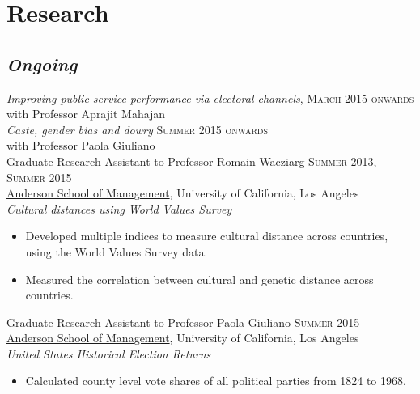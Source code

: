 \documentclass[11pt]{article}
\begin{document}
\section{Research}
\label{sec-2}
\subsection{\textbf{\emph{Ongoing}}}
\label{sec-2-1}
\flushleft
\emph{Improving public service performance via electoral channels}, \hfill \textsc{\normalsize March 2015 onwards}\\
with Professor Aprajit Mahajan\\
\vspace{0.5em}
\emph{Caste, gender bias and dowry} \hfill \textsc{\normalsize Summer 2015 onwards}\\
with Professor Paola Giuliano\\
\vspace{0.5em}
Graduate Research Assistant to Professor Romain Wacziarg \hfill
\textsc{\normalsize Summer 2013, Summer 2015}\\
\href{http://www.anderson.ucla.edu/faculty/global-economics-and-management/phd-program}{Anderson School of Management}, University of California, Los Angeles \\
\emph{Cultural distances using World Values Survey}
\begin{itemize}
\item Developed multiple indices to measure cultural distance across countries, using the World Values Survey data.
\item Measured the correlation between cultural and genetic distance across countries.
\end{itemize}
\vspace{0.5em}
Graduate Research Assistant to Professor Paola Giuliano \hfill
\textsc{\normalsize Summer 2015}\\
\href{http://www.anderson.ucla.edu/faculty/global-economics-and-management/phd-program}{Anderson School of Management}, University of California, Los Angeles \\
\emph{United States Historical Election Returns}
\begin{itemize}
\item Calculated county level vote shares of all political parties from 1824 to 1968.
\end{itemize}
\vspace{0.5em}
\end{document}
